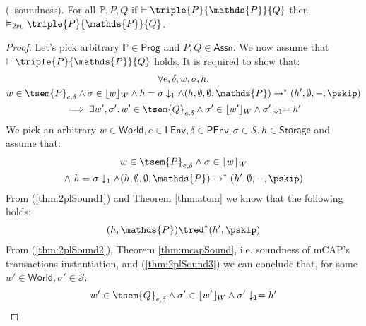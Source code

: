 \begin{thm}
	\label{thm:2plSound}
	(\tpl\ soundness).
	For all $\mathds{P}, P, Q$ if $\vdash \triple{P}{\mathds{P}}{Q}$ then $\vDash_\textsc{2pl} \triple{P}{\mathds{P}}{Q}$.
	\begin{proof}
		Let's pick arbitrary $\mathds{P} \in \mathsf{Prog}$ and $P, Q \in \mathsf{Assn}$. We now assume that $\vdash \triple{P}{\mathds{P}}{Q}$ holds. It is required to show that:
		\begin{gather}
			\forall e, \delta, w, \sigma, h \ldotp \\
			w \in \tsem{P}_{e, \delta} \land \sigma \in \lfloor w \rfloor_W \land h = \sigma \downarrow_1 \land (h, \emptyset, \emptyset, \mathds{P}) \rightarrow^* (h', \emptyset, -, \pskip) \\
			\implies \exists w', \sigma' \ldotp w' \in \tsem{Q}_{e, \delta} \land \sigma' \in \lfloor w' \rfloor_W \land \sigma' \downarrow_1 = h'
		\end{gather}
		We pick an arbitrary $w \in \mathsf{World}, e \in \mathsf{LEnv}, \delta \in \mathsf{PEnv}, \sigma \in \mathcal{S}, h \in \mathsf{Storage}$ and assume that:
		\begin{gather}
			\label{thm:2plSound2} w \in \tsem{P}_{e, \delta} \land \sigma \in \lfloor w \rfloor_W \\
			\label{thm:2plSound1} \land\ h = \sigma \downarrow_1 \land (h, \emptyset, \emptyset, \mathds{P}) \rightarrow^* (h', \emptyset, -, \pskip)
		\end{gather}
		From (\ref{thm:2plSound1}) and Theorem \ref{thm:atom} we know that the following holds:
		\begin{gather}
			\label{thm:2plSound3}
			(h, \mathds{P}) \tred^* (h', \pskip)
		\end{gather}
		From (\ref{thm:2plSound2}), Theorem \ref{thm:mcapSound}, i.e. soundness of mCAP's transactions instantiation, and (\ref{thm:2plSound3}) we can conclude that, for some $w' \in \mathsf{World}, \sigma' \in \mathcal{S}$:
		\[
			w' \in \tsem{Q}_{e, \delta} \land \sigma' \in \lfloor w' \rfloor_W \land \sigma' \downarrow_1 = h'
		\]
	\end{proof}
\end{thm}
\fi